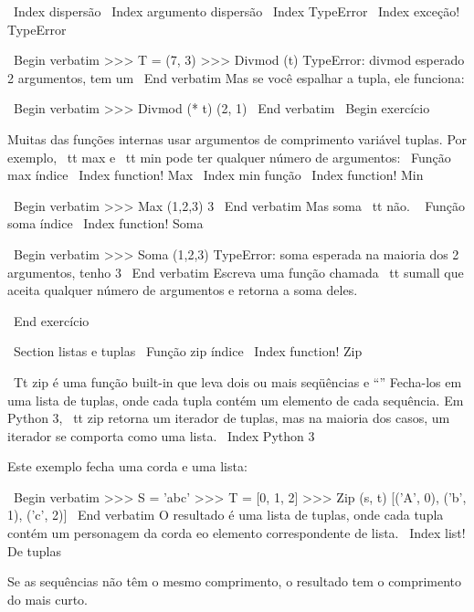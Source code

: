 \documentclass[10pt]{book}
\begin{document}
{{{{{{{{%

%
\ Index {dispersão}
\ Index {argumento dispersão}
\ Index {} TypeError
\ Index {exceção! TypeError}

\ Begin {verbatim}
>>> T = (7, 3)
>>> Divmod (t)
TypeError: divmod esperado 2 argumentos, tem um
\ End {verbatim}
%
Mas se você espalhar a tupla, ele funciona:

\ Begin {verbatim}
>>> Divmod (* t)
(2, 1)
\ End {verbatim}
%
\ Begin {} exercício

Muitas das funções internas usar
argumentos de comprimento variável tuplas. Por exemplo, {\ tt max}
e {\ tt min} pode ter qualquer número de argumentos:
\ {Função max} índice
\ Index {function! Max}
\ Index {min função}
\ Index {function! Min}

\ Begin {verbatim}
>>> Max (1,2,3)
3
\ End {verbatim}
%
Mas {soma \ tt} não.
\ {} Função soma índice
\ Index {function! Soma}

\ Begin {verbatim}
>>> Soma (1,2,3)
TypeError: soma esperada na maioria dos 2 argumentos, tenho 3
\ End {verbatim}
%
Escreva uma função chamada {\ tt sumall} que aceita qualquer número
de argumentos e retorna a soma deles.

\ End {} exercício


\ Section {listas e tuplas}
\ {Função zip} índice
\ Index {function! Zip}

{\ Tt zip} é uma função built-in que leva dois ou mais seqüências e
``'' Fecha-los em uma lista de tuplas, onde cada tupla contém um
elemento de cada sequência. Em Python 3, {\ tt zip} retorna um iterador
de tuplas, mas na maioria dos casos, um iterador se comporta como uma lista.
\ Index {Python 3}

Este exemplo fecha uma corda e uma lista:

\ Begin {verbatim}
>>> S = 'abc'
>>> T = [0, 1, 2]
>>> Zip (s, t)
[('A', 0), ('b', 1), ('c', 2)]
\ End {verbatim}
%
O resultado é uma lista de tuplas, onde cada tupla contém
um personagem da corda eo elemento correspondente de
lista.
\ Index {list! De tuplas}

Se as sequências não têm o mesmo comprimento, o resultado tem o
comprimento do mais curto.

}}}}}}}}
\end{document}

